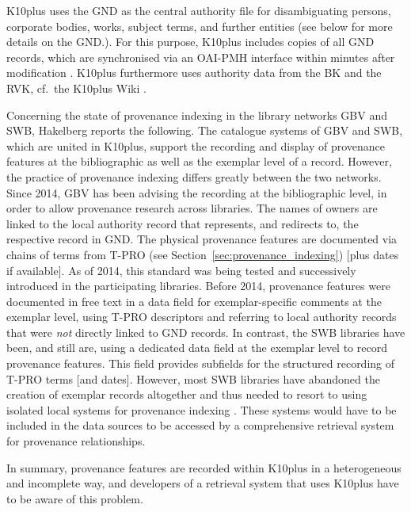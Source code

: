K10plus uses the \gls{GND} as the central authority file for disambiguating
persons, corporate bodies, works, subject terms, 
and further entities (see below for more details on the GND.).
For this purpose, K10plus includes 
copies of all \gls{GND} records, which are synchronised via an \gls{OAI-PMH} interface
within minutes after modification \autocite[cf.][]{K10plusHandbuchNormdaten}.
K10plus furthermore uses authority data from the \gls{BK} and the \gls{RVK},
cf.\ the K10plus Wiki \autocite{K10plusWikiNormdaten}.

Concerning the state of provenance indexing in the library networks \gls{GBV} and \gls{SWB},
Hakelberg \autocite*[§4]{Hakelberg2016} reports the following.
The catalogue systems of \gls{GBV} and \gls{SWB}, which are united in K10plus,
support the recording and display
of provenance features at the bibliographic as well as the exemplar level of a record.
However, the practice of provenance indexing differs greatly between the two networks.
Since 2014, GBV has been advising the recording at the bibliographic level,
in order to allow provenance research across libraries. The names of owners are linked
to the local authority record that represents, and redirects to, the respective record in \gls{GND}.
The physical provenance features are documented via chains of terms from
\gls{T-PRO} (see Section~\ref{sec:provenance_indexing}) [plus dates if available].
As of 2014,
this standard was being tested and successively introduced in the participating libraries.
Before 2014, provenance features were documented in free text in a data field for
exemplar-specific comments at the exemplar level, using \gls{T-PRO} descriptors 
and referring to local authority records that were \emph{not} directly linked to \gls{GND} records.
In contrast, the \gls{SWB} libraries have been, and still are, using a dedicated data field
at the exemplar level to record provenance features.
This field provides subfields for the structured recording of T-PRO terms [and dates].
However, most \gls{SWB} libraries have abandoned the creation of exemplar records altogether
and thus needed to resort to using isolated local systems for provenance indexing \autocite[cf.][]{Hakelberg2016}.
These systems would have to be included in the data sources to be accessed by a comprehensive retrieval system
for provenance relationships.

In summary, provenance features are recorded within K10plus in a heterogeneous
and incomplete way, and developers of a retrieval system that uses K10plus have to
be aware of this problem.

